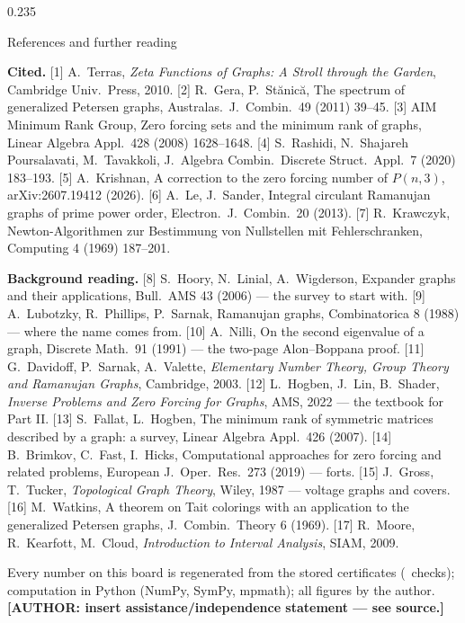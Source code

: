 \documentclass[final]{beamer}
\newenvironment{card}[1]{\begin{tcolorbox}[colback=white,colframe=white,boxrule=0pt,arc=10pt,
   left=10pt,right=10pt,top=10pt,bottom=12pt,boxsep=0pt,before skip=16pt,after skip=0pt,
   title={#1},fonttitle=\Large\bfseries\titlefont,colbacktitle=ink,coltitle=white,halign title=center,
   toptitle=7pt,bottomtitle=7pt]}{\end{tcolorbox}}
\begin{document}
\begin{frame}[t]
\begin{columns}[t,onlytextwidth]
\begin{column}{0.235\textwidth}
\begin{colwrap}
\begin{upper}
\begin{card}{Open problems}
\end{card}
\end{upper}
\begin{lastcard}{References and further reading}
{\scriptsize
\textbf{Cited.}
[1] A.~Terras, \emph{Zeta Functions of Graphs: A Stroll through the Garden}, Cambridge Univ.\ Press, 2010.
[2] R.~Gera, P.~St\u{a}nic\u{a}, The spectrum of generalized Petersen graphs, Australas.\ J.\ Combin.\ 49 (2011) 39--45.
[3] AIM Minimum Rank Group, Zero forcing sets and the minimum rank of graphs, Linear Algebra Appl.\ 428 (2008) 1628--1648.
[4] S.~Rashidi, N.~Shajareh Poursalavati, M.~Tavakkoli, J.\ Algebra Combin.\ Discrete Struct.\ Appl.\ 7 (2020) 183--193.
[5] A.~Krishnan, A correction to the zero forcing number of $P(n,3)$, arXiv:2607.19412 (2026).
[6] A.~Le, J.~Sander, Integral circulant Ramanujan graphs of prime power order, Electron.\ J.\ Combin.\ 20 (2013).
[7] R.~Krawczyk, Newton-Algorithmen zur Bestimmung von Nullstellen mit Fehlerschranken, Computing 4 (1969) 187--201.

\textbf{Background reading.}
[8] S.~Hoory, N.~Linial, A.~Wigderson, Expander graphs and their applications, Bull.\ AMS 43 (2006) --- the survey to start with.
[9] A.~Lubotzky, R.~Phillips, P.~Sarnak, Ramanujan graphs, Combinatorica 8 (1988) --- where the name comes from.
[10] A.~Nilli, On the second eigenvalue of a graph, Discrete Math.\ 91 (1991) --- the two-page Alon--Boppana proof.
[11] G.~Davidoff, P.~Sarnak, A.~Valette, \emph{Elementary Number Theory, Group Theory and Ramanujan Graphs}, Cambridge, 2003.
[12] L.~Hogben, J.~Lin, B.~Shader, \emph{Inverse Problems and Zero Forcing for Graphs}, AMS, 2022 --- the textbook for Part II.
[13] S.~Fallat, L.~Hogben, The minimum rank of symmetric matrices described by a graph: a survey, Linear Algebra Appl.\ 426 (2007).
[14] B.~Brimkov, C.~Fast, I.~Hicks, Computational approaches for zero forcing and related problems, European J.\ Oper.\ Res.\ 273 (2019) --- forts.
[15] J.~Gross, T.~Tucker, \emph{Topological Graph Theory}, Wiley, 1987 --- voltage graphs and covers.
[16] M.~Watkins, A theorem on Tait colorings with an application to the generalized Petersen graphs, J.\ Combin.\ Theory 6 (1969).
[17] R.~Moore, R.~Kearfott, M.~Cloud, \emph{Introduction to Interval Analysis}, SIAM, 2009.
\vspace{3pt}

Every number on this board is regenerated from the stored certificates (\Nchecks\ checks); computation in Python (NumPy, SymPy, mpmath); all figures by the author.
\textbf{[AUTHOR: insert assistance/independence statement --- see source.]}\par}
\end{lastcard}
\end{colwrap}
\end{column}
\end{columns}

\end{frame}
\end{document}
